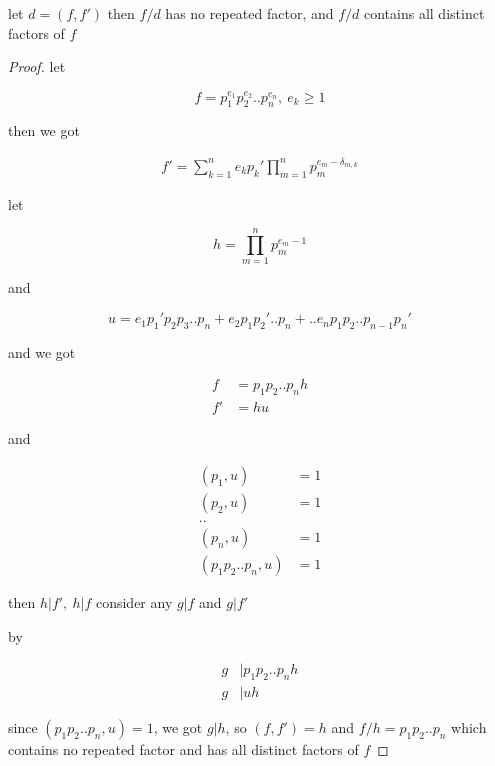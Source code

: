 \begin{exercise}
    let $d = (f, f')$ then $f/d$ has no repeated factor, and $f/d$ contains all distinct factors of $f$
\end{exercise}

\begin{proof}
    let 
    
    \[
        f = p_1^{e_1}p_2^{e_2}..p_n^{e_n},\: e_k \ge 1
    \]

    then we got

    \begin{align*}
        f' = \sum_{k=1}^{n} e_kp_k'\prod_{m = 1}^{n}p_m^{e_m - \delta_{m,k}}
    \end{align*}

    let


    \[
        h = \prod_{m=1}^{n}p_m^{e_m - 1}
    \]

    and

    \[
        u = e_1p_1'p_2p_3..p_n + e_2p_1p_2'..p_n  + .. e_np_1p_2..p_{n-1}p_n'
    \]

    and we got 

    \begin{align*}
        f &= p_1p_2..p_nh \\
        f' &= hu
    \end{align*}

    and

    \begin{align*}
        (p_1, u) &= 1 \\
        (p_2, u) &= 1 \\
        .. \\
        (p_n, u) &= 1 \\
        (p_1p_2..p_n, u) &= 1
    \end{align*}

    then $h | f',\: h |f$ consider any $g | f$ and $g | f'$

    by

    \begin{align*}
        g &| p_1p_2..p_n h \\
        g &| uh 
    \end{align*}

    since $(p_1p_2..p_n, u)= 1$, we got $g | h$, so $(f,f') = h$ and $f/h = p_1p_2..p_n$ which contains no repeated factor 
    and has all distinct factors of $f$
\end{proof}
